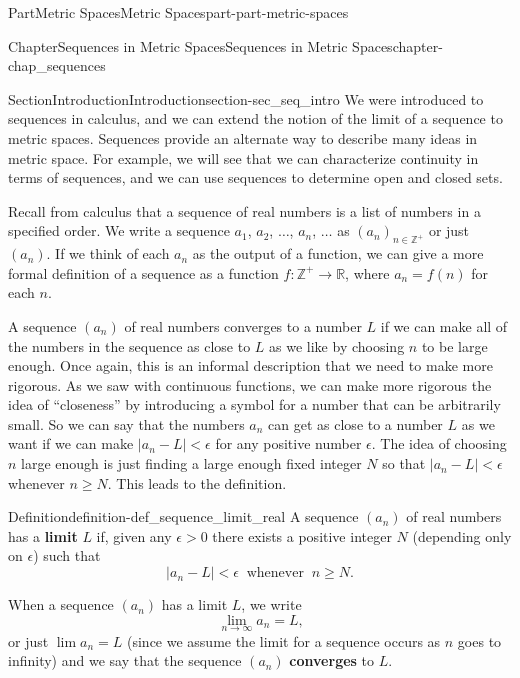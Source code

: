 \documentclass[oneside,10pt,]{book}
\newcommand{\terminology}[1]{\textbf{#1}}
\numberwithin{equation}{chapter}
\newcommand{\Z}{\mathbb{Z}}
\newcommand{\R}{\mathbb{R}}
\newcommand{\lt}{<}
\newcommand{\gt}{>}
\begin{document}
\begin{partptx}{Part}{Metric Spaces}{}{Metric Spaces}{}{}{part-part-metric-spaces}
\begin{chapterptx}{Chapter}{Sequences in Metric Spaces}{}{Sequences in Metric Spaces}{}{}{chapter-chap_sequences}
%
\begin{sectionptx}{Section}{Introduction}{}{Introduction}{}{}{section-sec_seq_intro}
We were introduced to sequences in calculus, and we can extend the notion of the limit of a sequence to metric spaces. Sequences provide an alternate way to describe many ideas in metric space. For example, we will see that we can characterize continuity in terms of sequences, and we can use sequences to determine open and closed sets.%
\par
Recall from calculus that a sequence of real numbers is a list of numbers in a specified order. We write a sequence \(a_1\), \(a_2\), \(\ldots\), \(a_n\), \(\ldots\) as \((a_n)_{n \in \Z^+}\) or just \((a_n)\). If we think of each \(a_n\) as the output of a function, we can give a more formal definition of a sequence as a function \(f: \Z^+ \to \R\), where \(a_n = f(n)\) for each \(n\).%
\par
A sequence \((a_n)\) of real numbers converges to a number \(L\) if we can make all of the numbers in the sequence as close to \(L\) as we like by choosing \(n\) to be large enough. Once again, this is an informal description that we need to make more rigorous. As we saw with continuous functions, we can make more rigorous the idea of ``closeness'' by introducing a symbol for a number that can be arbitrarily small. So we can say that the numbers \(a_n\) can get as close to a number \(L\) as we want if we can make \(| a_n - L | \lt \epsilon\) for any positive number \(\epsilon\). The idea of choosing \(n\) large enough is just finding a large enough fixed integer \(N\) so that \(| a_n - L | \lt \epsilon\) whenever \(n \geq N\). This leads to the definition.%
\begin{definition}{Definition}{}{definition-def_sequence_limit_real}%
%
A sequence \((a_n)\) of real numbers has a \terminology{limit} \(L\) if, given any \(\epsilon \gt 0\) there exists a positive integer \(N\) (depending only on \(\epsilon\)) such that%
\begin{equation*}
| a_n - L | \lt  \epsilon \ \text{ whenever }  \ n \geq N\text{.}
\end{equation*}
%
\end{definition}
When a sequence \((a_n)\) has a limit \(L\), we write%
\begin{equation*}
\lim_{n \to \infty} a_n = L\text{,}
\end{equation*}
or just \(\lim a_n = L\) (since we assume the limit for a sequence occurs as \(n\) goes to infinity) and we say that the sequence \((a_n)\) \terminology{converges} to \(L\).%

\end{sectionptx}
\end{chapterptx}
\end{partptx}
\end{document}
